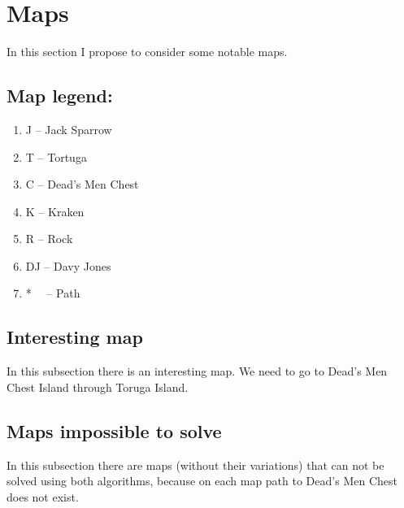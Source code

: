 \documentclass[a4paper]{article}
\begin{document}
\section{Maps}
In this section I propose to consider some notable maps.
\subsection*{Map legend:}
\begin{enumerate}
    \item [] J -- Jack Sparrow
    \item [] T -- Tortuga
    \item [] C -- Dead's Men Chest
    \item [] K -- Kraken
    \item [] R -- Rock
    \item [] DJ -- Davy Jones
    \item [] * \ \  -- Path
\end{enumerate}
\subsection{Interesting map}
In this subsection there is an interesting map. We need to go to Dead's Men Chest Island through Toruga Island.
\begin{figure}[H]
    \centering
\end{figure}

\subsection{Maps impossible to solve}
In this subsection there are maps (without their variations) that can not be solved using both algorithms, because on each map path to Dead's Men Chest does not exist.
\end{document}

